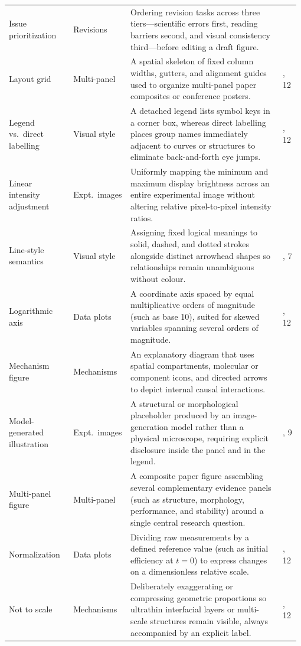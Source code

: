 \begin{longtable}{@{}>{\raggedright\arraybackslash}p{0.22\linewidth}>{\raggedright\arraybackslash}p{0.18\linewidth}>{\raggedright\arraybackslash}p{0.52\linewidth}>{\raggedright\arraybackslash}p{0.06\linewidth}@{}}
Issue prioritization & Revisions & Ordering revision tasks across three tiers---scientific errors first, reading barriers second, and visual consistency third---before editing a draft figure. & 11 \\
Layout grid & Multi-panel & A spatial skeleton of fixed column widths, gutters, and alignment guides used to organize multi-panel paper composites or conference posters. & 9, 12 \\
Legend vs.\ direct labelling & Visual style & A detached legend lists symbol keys in a corner box, whereas direct labelling places group names immediately adjacent to curves or structures to eliminate back-and-forth eye jumps. & 4, 12 \\
Linear intensity adjustment & Expt.\ images & Uniformly mapping the minimum and maximum display brightness across an entire experimental image without altering relative pixel-to-pixel intensity ratios. & 8 \\
Line-style semantics & Visual style & Assigning fixed logical meanings to solid, dashed, and dotted strokes alongside distinct arrowhead shapes so relationships remain unambiguous without colour. & 4, 7 \\
Logarithmic axis & Data plots & A coordinate axis spaced by equal multiplicative orders of magnitude (such as base 10), suited for skewed variables spanning several orders of magnitude. & 5, 12 \\
Mechanism figure & Mechanisms & An explanatory diagram that uses spatial compartments, molecular or component icons, and directed arrows to depict internal causal interactions. & 7 \\
Model-generated illustration & Expt.\ images & A structural or morphological placeholder produced by an image-generation model rather than a physical microscope, requiring explicit disclosure inside the panel and in the legend. & 8, 9 \\
Multi-panel figure & Multi-panel & A composite paper figure assembling several complementary evidence panels (such as structure, morphology, performance, and stability) around a single central research question. & 9 \\
Normalization & Data plots & Dividing raw measurements by a defined reference value (such as initial efficiency at $t=0$) to express changes on a dimensionless relative scale. & 5, 12 \\
Not to scale & Mechanisms & Deliberately exaggerating or compressing geometric proportions so ultrathin interfacial layers or multi-scale structures remain visible, always accompanied by an explicit label. & 7, 12 \\

\end{longtable}
